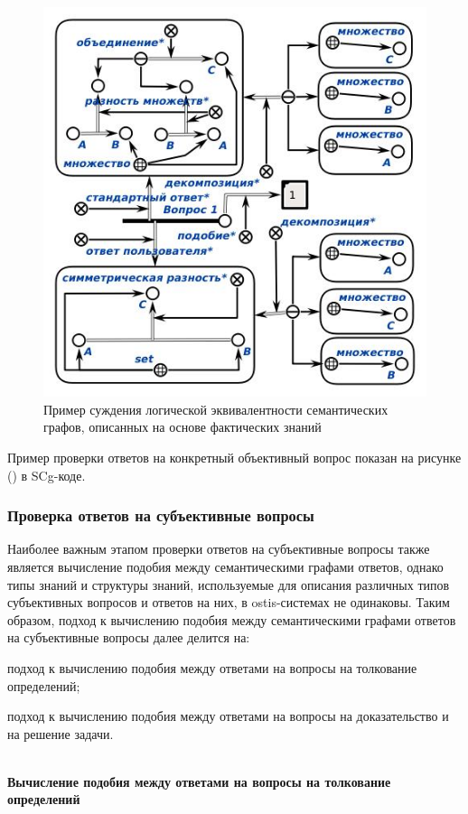 \begin{figure}[H]
	\includegraphics[scale=0.7]{author/part7/figures/logical_equivalence_example.jpg}
	\caption{Пример суждения логической эквивалентности семантических графов, описанных на основе фактических знаний}
	\label{fig:LE_example}
\end{figure}

Пример проверки ответов на конкретный объективный вопрос показан на рисунке (\textit{}) в SCg-коде.

\subsubsection{Проверка ответов на субъективные вопросы}

Наиболее важным этапом проверки ответов на субъективные вопросы также является вычисление подобия между семантическими графами ответов, однако типы знаний и структуры знаний, используемые для описания различных типов субъективных вопросов и ответов на них, в ostis-системах не одинаковы. Таким образом, подход к вычислению подобия между семантическими графами ответов на субъективные вопросы далее делится на:

\begin{textitemize}
	\item подход к вычислению подобия между ответами на вопросы на толкование определений;
	\item подход к вычислению подобия между ответами на вопросы на доказательство и на решение задачи.
\end{textitemize} 
~\\
\textbf{Вычисление подобия между ответами на вопросы на толкование определений} 

